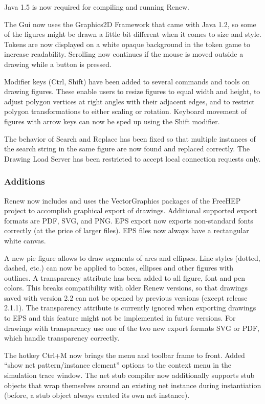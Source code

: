 Java 1.5 is now required for compiling and running Renew.

The Gui now uses the Graphics2D Framework that came with Java 1.2, so some of the figures might
be drawn a little bit different when it comes to size and style.
Tokens are now displayed on a white opaque background in the token game to
increase readability.
Scrolling now continues if the mouse is moved outside a drawing while a
button is pressed.

Modifier keys (Ctrl, Shift) have been added to several commands and tools
on drawing figures.
These enable users to resize figures to equal width and height, to adjust
polygon vertices at right angles with their adjacent edges, and to restrict
polygon transformations to either scaling or rotation.
Keyboard movement of figures with arrow keys can now be sped up using the
Shift modifier.

The behavior of Search and Replace has been fixed so that multiple instances of the search string 
in the same figure are now found and replaced correctly.
The Drawing Load Server has been restricted to accept local connection
requests only.

\subsubsection*{Additions}

Renew now includes and uses the VectorGraphics packages of the FreeHEP
project to accomplish graphical export of drawings. 
Additional supported export formats are PDF, SVG, and PNG.
EPS export now exports non-standard fonts correctly (at the price of larger
files).
EPS files now always have a rectangular white canvas.

A new pie figure allows to draw segments of arcs and ellipses.
Line styles (dotted, dashed, etc.) can now be applied to boxes, ellipses
and other figures with outlines.
A transparency attribute has been added to all figure, font and pen colors.
This breaks compatibility with older Renew versions, so that drawings saved with version 2.2 
can not be opened by previous versions (except release 2.1.1).
The transparency attribute is currently ignored when exporting drawings to EPS and this feature 
might not be implemented in future versions.
For drawings with transparency use one of the two new export formats SVG or
PDF, which handle transparency correctly.

The hotkey Ctrl+M now brings the menu and toolbar frame to front.
Added ``show net pattern/instance element'' options to the context menu in
the simulation trace window.
The net stub compiler now additionally supports stub objects that wrap
themselves around an existing net instance during instantiation (before, a
stub object always created its own net instance).

